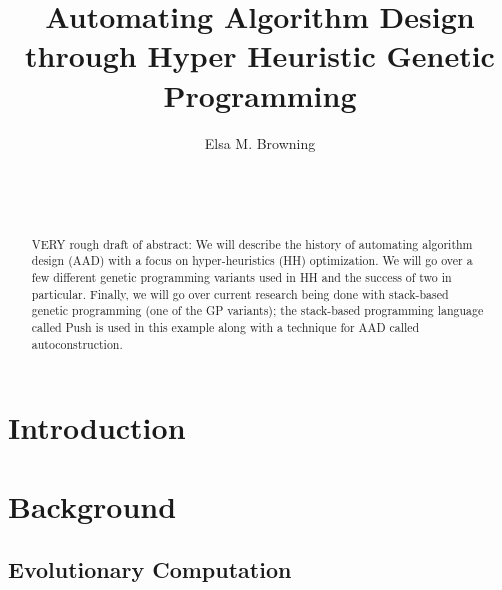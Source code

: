 \documentclass{sig-alternate}
\begin{document}

\title{Automating Algorithm Design through Hyper Heuristic Genetic Programming}


\author{
\alignauthor
Elsa M. Browning\\
	\\
	\\
	\\
}

\maketitle
\begin{abstract}
	 VERY rough draft of abstract: We will describe the history of automating algorithm design (AAD) with a focus on hyper-heuristics (HH) optimization. We will go over a few different genetic programming variants used in HH and the success of two in particular. Finally, we will go over current research being done with stack-based genetic programming (one of the GP variants); the stack-based programming language called Push is used in this example along with a technique for AAD called autoconstruction.
	
\end{abstract}


\section{Introduction}
\label{sec:introduction}

\section{Background}
\label{sec:background}

\subsection{Evolutionary Computation}
\label{sec:evocomp}
\end{document}
